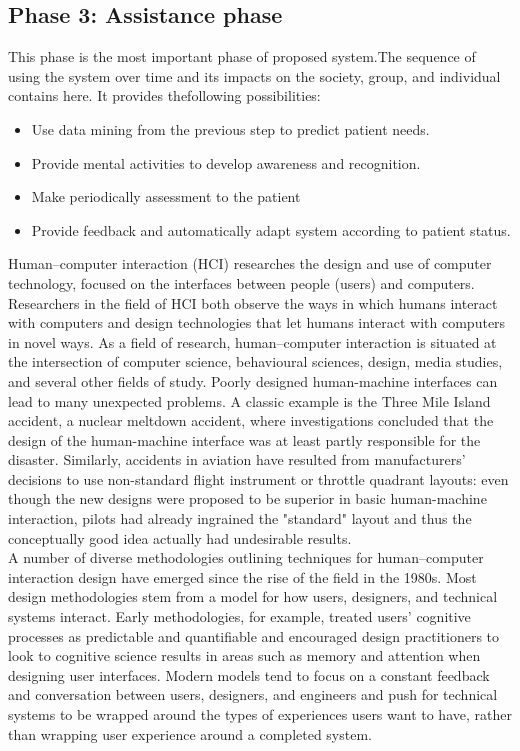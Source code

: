 \subsection{Phase 3: Assistance phase }
This phase is the most important phase of proposed system.The sequence of using the system over time and its impacts on the society, group, and individual contains here. It provides thefollowing possibilities:
\begin{itemize}
  \item  Use data mining from the previous step to predict patient needs.
  \item Provide mental activities to develop awareness and recognition.
\item  Make periodically assessment to the patient
\item Provide feedback and automatically adapt system according to patient status. 


\end{itemize}
Human–computer interaction (HCI) researches the design and use of computer technology, focused on the interfaces between people (users) and computers. Researchers in the field of HCI both observe the ways in which humans interact with computers and design technologies that let humans interact with computers in novel ways. As a field of research, human–computer interaction is situated at the intersection of computer science, behavioural sciences, design, media studies, and several other fields of study. Poorly designed human-machine interfaces can lead to many unexpected problems. A classic example is the Three Mile Island accident, a nuclear meltdown accident, where investigations concluded that the design of the human-machine interface was at least partly responsible for the disaster. Similarly, accidents in aviation have resulted from manufacturers' decisions to use non-standard flight instrument or throttle quadrant layouts: even though the new designs were proposed to be superior in basic human-machine interaction, pilots had already ingrained the "standard" layout and thus the conceptually good idea actually had undesirable results.\\A number of diverse methodologies outlining techniques for human–computer interaction design have emerged since the rise of the field in the 1980s. Most design methodologies stem from a model for how users, designers, and technical systems interact. Early methodologies, for example, treated users' cognitive processes as predictable and quantifiable and encouraged design practitioners to look to cognitive science results in areas such as memory and attention when designing user interfaces. Modern models tend to focus on a constant feedback and conversation between users, designers, and engineers and push for technical systems to be wrapped around the types of experiences users want to have, rather than wrapping user experience around a completed system.

